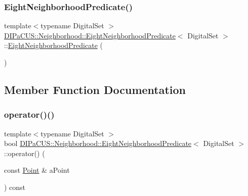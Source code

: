 \subsubsection{\texorpdfstring{Eight\+Neighborhood\+Predicate()}{EightNeighborhoodPredicate()}\hspace{0.1cm}{\footnotesize\ttfamily [2/2]}}
{\footnotesize\ttfamily template$<$typename Digital\+Set $>$ \\
\mbox{\hyperlink{classDIPaCUS_1_1Neighborhood_1_1EightNeighborhoodPredicate}{D\+I\+Pa\+C\+U\+S\+::\+Neighborhood\+::\+Eight\+Neighborhood\+Predicate}}$<$ Digital\+Set $>$\+::\mbox{\hyperlink{classDIPaCUS_1_1Neighborhood_1_1EightNeighborhoodPredicate}{Eight\+Neighborhood\+Predicate}} (\begin{DoxyParamCaption}{ }\end{DoxyParamCaption})\hspace{0.3cm}{\ttfamily [protected]}}



\subsection{Member Function Documentation}
\mbox{\label{classDIPaCUS_1_1Neighborhood_1_1EightNeighborhoodPredicate_a2c7c5993b526beaf4c59b562f90adef9}} 
\subsubsection{\texorpdfstring{operator()()}{operator()()}\hspace{0.1cm}{\footnotesize\ttfamily [1/2]}}
{\footnotesize\ttfamily template$<$typename Digital\+Set $>$ \\
bool \mbox{\hyperlink{classDIPaCUS_1_1Neighborhood_1_1EightNeighborhoodPredicate}{D\+I\+Pa\+C\+U\+S\+::\+Neighborhood\+::\+Eight\+Neighborhood\+Predicate}}$<$ Digital\+Set $>$\+::operator() (\begin{DoxyParamCaption}\item[{const \mbox{\hyperlink{classDIPaCUS_1_1Neighborhood_1_1EightNeighborhoodPredicate_afd5b888b29042dd8ea3da17b3c3ee8cb}{Point}} \&}]{a\+Point }\end{DoxyParamCaption}) const\hspace{0.3cm}{\ttfamily [inline]}}

